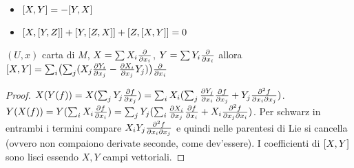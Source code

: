 \begin{itemize}
    \item $\comm{X}{Y}=-\comm{Y}{X}$
    \item $\comm{X}{\comm{Y}{Z}}+\comm{Y}{\comm{Z}{X}}+
        \comm{Z}{\comm{X}{Y}}=0$
\end{itemize}
\begin{theorem}
    $(U,x)$ carta di $M$, $X=\sum X_i\pdv{x_i}$, $Y=\sum Y_i
    \pdv{x_i}$ allora $\comm{X}{Y}=
    \sum_i\bigl(\sum_j(X_j\pdv{Y_i}{x_j}-\pdv{X_i}{x_j}Y_j)\bigr)
    \pdv{x_i}$
\end{theorem}
\begin{proof}
    $X(Y(f))=X(\sum_j Y_j\pdv{f}{x_j})=\sum_i X_i(\sum_j
    \pdv{Y_j}{x_i}\pdv{f}{x_j}+Y_j\pdv{f}{x_i}{x_j})$.\\
    $Y(X(f))=Y(\sum_i X_i\pdv{f}{x_i})=\sum_j Y_j(\sum_i
    \pdv{X_i}{x_j}\pdv{f}{x_i}+X_i\pdv{f}{x_j}{x_i})$. 
    Per schwarz in entrambi i termini compare $X_i
    Y_j\pdv{f}{x_i}{x_j}$ e quindi nelle parentesi di Lie si
    cancella (ovvero non compaiono derivate seconde, come
    dev'essere). I coefficienti di $\comm{X}{Y}$ sono lisci essendo
    $X,Y$ campi vettoriali.
\end{proof}

